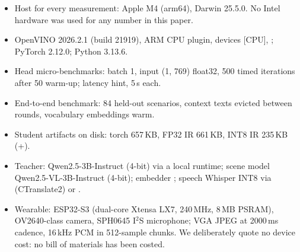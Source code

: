\begin{itemize}
\item Host for every measurement: Apple M4 (arm64), Darwin 25.5.0. No Intel
hardware was used for any number in this paper.
\item OpenVINO 2026.2.1 (build 21919), ARM CPU plugin, devices [CPU],
; PyTorch 2.12.0; Python 3.13.6.
\item Head micro-benchmarks: batch 1, input (1, 769) float32, 500 timed
iterations after 50 warm-up;  latency hint, 5\,s each.
\item End-to-end benchmark: 84 held-out scenarios, context texts evicted
between rounds, vocabulary embeddings warm.
\item Student artifacts on disk: torch 657\,KB, FP32 IR 661\,KB, INT8 IR
235\,KB (+).
\item Teacher: Qwen2.5-3B-Instruct (4-bit) via a local runtime; scene model
Qwen2.5-VL-3B-Instruct (4-bit); embedder ; speech
Whisper  INT8 via  (CTranslate2) or
.
\item Wearable: ESP32-S3 (dual-core Xtensa LX7, 240\,MHz, 8\,MB PSRAM),
OV2640-class camera, SPH0645 I$^2$S microphone; VGA JPEG at 2000\,ms cadence,
16\,kHz PCM in 512-sample chunks. We deliberately quote no device
cost: no bill of materials has been costed.
\end{itemize}


